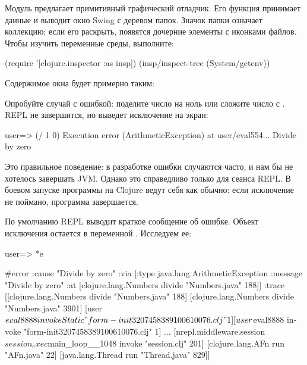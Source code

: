 Модуль  предлагает примитивный графический отладчик. Его функция  принимает данные и выводит окно Swing с деревом папок. Значок папки означает коллекцию; если его раскрыть, появятся дочерние элементы с иконками файлов. Чтобы изучить переменные среды, выполните:

\begin{english}
  \begin{clojure}
(require '[clojure.inspector :as insp])
(insp/inspect-tree (System/getenv))
  \end{clojure}
\end{english}

Содержимое окна будет примерно таким:


Опробуйте случай с ошибкой: поделите число на ноль или сложите число с . REPL не завершится, но выведет исключение на экран:

\begin{english}
  \begin{clojure}
user=> (/ 1 0)
Execution error (ArithmeticException) at user/eval554...
Divide by zero
  \end{clojure}
\end{english}

Это правильное поведение: в разработке ошибки случаются часто, и нам бы не хотелось завершать JVM. Однако это справедливо только для сеанса REPL. В боевом запуске программы на Clojure ведут себя как обычно: если исключение не поймано, программа завершается.

По умолчанию REPL выводит краткое сообщение об ошибке. Объект исключения остается в переменной . Исследуем ее:

\begin{english}
  \begin{clojure}
user=> *e

#error {
 :cause "Divide by zero"
 :via
 [{:type java.lang.ArithmeticException
   :message "Divide by zero"
   :at [clojure.lang.Numbers divide "Numbers.java" 188]}]
 :trace
 [[clojure.lang.Numbers divide "Numbers.java" 188]
  [clojure.lang.Numbers divide "Numbers.java" 3901]
  [user$eval8888 invokeStatic "form-init3207458389100610076.clj" 1]
  [user$eval8888 invoke "form-init3207458389100610076.clj" 1]
  ...
  [nrepl.middleware.session$session_exec$main_loop__1048 invoke "session.clj" 201]
  [clojure.lang.AFn run "AFn.java" 22]
  [java.lang.Thread run "Thread.java" 829]]}
  \end{clojure}
\end{english}

